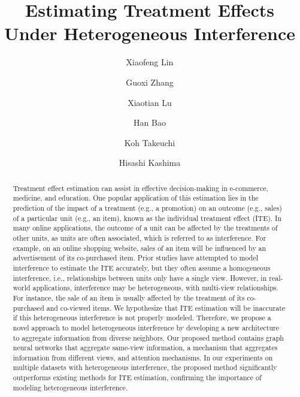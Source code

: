 \documentclass[runningheads]{llncs}
\begin{document}
%
\title{Estimating Treatment Effects Under Heterogeneous Interference}
%
%
\author{Xiaofeng Lin\Letter%
\and
Guoxi Zhang%
\and
Xiaotian Lu%
\and
Han Bao%
\and
Koh Takeuchi%
 \and
Hisashi Kashima%
}
%
%


\maketitle
\sloppy
\begin{abstract}
Treatment effect estimation can assist in effective decision-making in e-commerce, medicine, and education. One popular application of this estimation lies in the prediction of the impact of a treatment (e.g., a promotion) on an outcome (e.g., sales) of a particular unit (e.g., an item), known as the individual treatment effect (ITE).  In many online applications, the outcome of a unit can be affected by the treatments of other units, as units are often associated, which is referred to as interference. For example, on an online shopping website,  sales of an item will be influenced by an advertisement of its co-purchased item. Prior studies have attempted to model interference to estimate the ITE accurately, but they often assume a homogeneous interference, i.e., relationships between units only have a single view. However, in real-world applications, interference may be heterogeneous, with multi-view relationships. For instance,  the sale of an item is usually affected by the treatment of its co-purchased and co-viewed items. We hypothesize that ITE estimation will be inaccurate if this heterogeneous interference is not properly modeled. Therefore, we propose a novel approach to model heterogeneous interference by developing a new architecture to aggregate information from diverse neighbors. Our proposed method contains graph neural networks that aggregate same-view information, a mechanism that aggregates information from different views, and attention mechanisms. In our experiments on multiple datasets with heterogeneous interference, the proposed method significantly outperforms existing methods for ITE estimation, confirming the importance of modeling heterogeneous interference.



\end{abstract}
\end{document}
